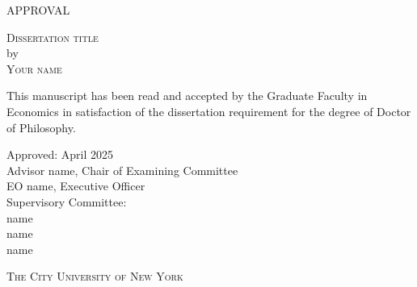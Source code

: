 \begin{center}
    \textsc{APPROVAL} \\[0.15in]
\end{center}
\begin{center}
    

\textsc{Dissertation title} \\[0.15in]
by \\[0.15in]

\textsc{Your name}\\[0.15in]
\end{center}
\begin{center}
This manuscript has been read and accepted by the Graduate Faculty in Economics in satisfaction of the dissertation requirement for the degree of Doctor of Philosophy.\\[0.15in]
\end{center}
\begin{center}
    Approved: April 2025\\[0.15in]

    Advisor name, Chair of Examining Committee\\
     EO name, Executive Officer\\[0.15in]
     Supervisory Committee:\\
     name\\
     name\\
     name
\end{center}
\vspace{0.75in}




\vspace{\fill}
\begin{center}
\textsc{The City University of New York}
\end{center}